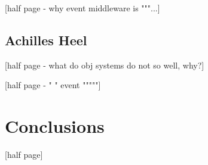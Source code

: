 \documentclass{acm_proc_article-sp}
\begin{document}
[half page - why event middleware is  """...]


\subsection{Achilles Heel}

[half page - what do obj systems do not so well, why?]

[half page - "    "  event """""]


\section{Conclusions}

[half page]




\balancecolumns
\end{document}

